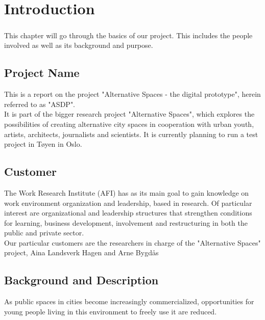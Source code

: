 \chapter{Introduction}

\paragraph{} This chapter will go through the basics of our project. This includes the people involved as well as its background and purpose.

\section{Project Name} 
This is a report on the project "Alternative Spaces - the digital prototype", herein referred to as "ASDP".\\
\indent It is part of the bigger research project "Alternative Spaces", which explores the possibilities of creating alternative city spaces in cooperation with urban youth, artists, architects, journalists and scientists. It is currently planning to run a test project in T\o yen in Oslo.

\section{Customer}
The Work Research Institute (AFI) has as its main goal to gain knowledge on work environment organization and leadership, based in research. Of particular interest are organizational and leadership structures that strengthen conditions for learning, business development, involvement and restructuring in both the public and private sector.\\
\indent Our particular customers are the researchers in charge of the "Alternative Spaces" project, Aina Landsverk Hagen and Arne Bygd\aa s

\section{Background and Description}
As public spaces in cities become increasingly commercialized, opportunities for young people living in this environment to freely use it are reduced.